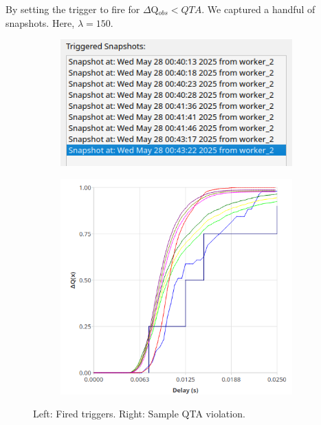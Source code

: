             By setting the trigger to fire for $\Delta$Q$_{obs} < QTA$. We captured a handful of snapshots. Here, $\lambda = 150$.
        
        \begin{figure}[H]
            \centering
            \begin{subfigure}{.5\textwidth}
                \centering
                \includegraphics[width=0.98\textwidth]{img/overload_2/snapshots.png}
                \label{fig:high_load_1}
            \end{subfigure}%
            \begin{subfigure}{.5\textwidth}
                \centering
                \includegraphics[width =0.98\textwidth]{img/overload_2/qta_fired.png}
                \label{fig:high_load_2}
            \end{subfigure}
            \label{fig:early_ov}
            \caption{Left: Fired triggers. Right: Sample QTA violation.} %
        \end{figure}


